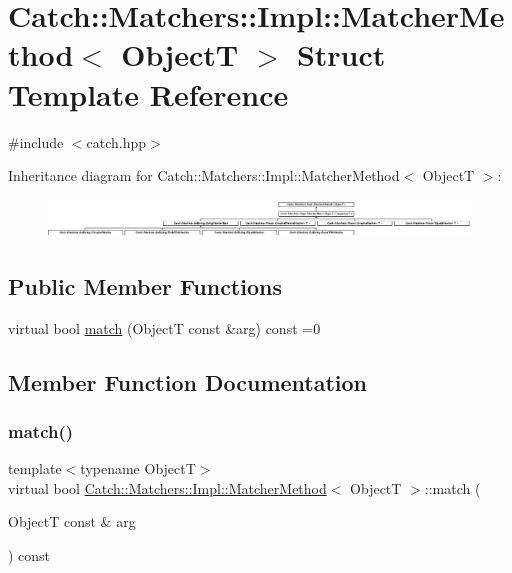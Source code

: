 \hypertarget{struct_catch_1_1_matchers_1_1_impl_1_1_matcher_method}{}\section{Catch\+:\+:Matchers\+:\+:Impl\+:\+:Matcher\+Method$<$ ObjectT $>$ Struct Template Reference}
\label{struct_catch_1_1_matchers_1_1_impl_1_1_matcher_method}


{\ttfamily \#include $<$catch.\+hpp$>$}

Inheritance diagram for Catch\+:\+:Matchers\+:\+:Impl\+:\+:Matcher\+Method$<$ ObjectT $>$\+:\begin{figure}[H]
\begin{center}
\leavevmode
\includegraphics[height=1.006289cm]{struct_catch_1_1_matchers_1_1_impl_1_1_matcher_method}
\end{center}
\end{figure}
\subsection*{Public Member Functions}
\begin{DoxyCompactItemize}
\item 
virtual bool \mbox{\hyperlink{struct_catch_1_1_matchers_1_1_impl_1_1_matcher_method_ae0920ff9e817acf08e1bb0cbcb044e30}{match}} (ObjectT const \&arg) const =0
\end{DoxyCompactItemize}


\subsection{Member Function Documentation}
\mbox{\label{struct_catch_1_1_matchers_1_1_impl_1_1_matcher_method_ae0920ff9e817acf08e1bb0cbcb044e30}} 
\subsubsection{\texorpdfstring{match()}{match()}}
{\footnotesize\ttfamily template$<$typename ObjectT$>$ \\
virtual bool \mbox{\hyperlink{struct_catch_1_1_matchers_1_1_impl_1_1_matcher_method}{Catch\+::\+Matchers\+::\+Impl\+::\+Matcher\+Method}}$<$ ObjectT $>$\+::match (\begin{DoxyParamCaption}\item[{ObjectT const \&}]{arg }\end{DoxyParamCaption}) const\hspace{0.3cm}{\ttfamily [pure virtual]}}



